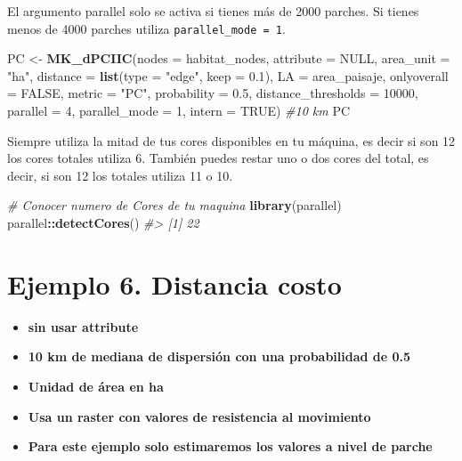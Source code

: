 \documentclass[
]{book}
\newenvironment{Shaded}{\begin{snugshade}}{\end{snugshade}}
\newcommand{\AttributeTok}[1]{\textcolor[rgb]{0.13,0.29,0.53}{#1}}
\newcommand{\CommentTok}[1]{\textcolor[rgb]{0.56,0.35,0.01}{\textit{#1}}}
\newcommand{\ConstantTok}[1]{\textcolor[rgb]{0.56,0.35,0.01}{#1}}
\newcommand{\DecValTok}[1]{\textcolor[rgb]{0.00,0.00,0.81}{#1}}
\newcommand{\FloatTok}[1]{\textcolor[rgb]{0.00,0.00,0.81}{#1}}
\newcommand{\FunctionTok}[1]{\textcolor[rgb]{0.13,0.29,0.53}{\textbf{#1}}}
\newcommand{\NormalTok}[1]{#1}
\newcommand{\OtherTok}[1]{\textcolor[rgb]{0.56,0.35,0.01}{#1}}
\newcommand{\SpecialCharTok}[1]{\textcolor[rgb]{0.81,0.36,0.00}{\textbf{#1}}}
\newcommand{\StringTok}[1]{\textcolor[rgb]{0.31,0.60,0.02}{#1}}
\providecommand{\tightlist}{%
  \setlength{\itemsep}{0pt}\setlength{\parskip}{0pt}}
\begin{document}
El argumento parallel solo se activa si tienes más de 2000 parches. Si tienes menos de 4000 parches utiliza \texttt{parallel\_mode\ =\ 1}.

\begin{Shaded}
\begin{Highlighting}[]
\NormalTok{PC }\OtherTok{\textless{}{-}} \FunctionTok{MK\_dPCIIC}\NormalTok{(}\AttributeTok{nodes =}\NormalTok{ habitat\_nodes,}
                \AttributeTok{attribute =} \ConstantTok{NULL}\NormalTok{,}
                \AttributeTok{area\_unit =} \StringTok{"ha"}\NormalTok{,}
                \AttributeTok{distance =} \FunctionTok{list}\NormalTok{(}\AttributeTok{type =} \StringTok{"edge"}\NormalTok{, }\AttributeTok{keep =} \FloatTok{0.1}\NormalTok{),}
                \AttributeTok{LA =}\NormalTok{ area\_paisaje,}
                \AttributeTok{onlyoverall =} \ConstantTok{FALSE}\NormalTok{,}
                \AttributeTok{metric =} \StringTok{"PC"}\NormalTok{,}
                \AttributeTok{probability =} \FloatTok{0.5}\NormalTok{,}
                \AttributeTok{distance\_thresholds =} \DecValTok{10000}\NormalTok{,}
                \AttributeTok{parallel =} \DecValTok{4}\NormalTok{,}
                \AttributeTok{parallel\_mode =} \DecValTok{1}\NormalTok{,}
                \AttributeTok{intern =} \ConstantTok{TRUE}\NormalTok{) }\CommentTok{\#10 km}
\NormalTok{PC}
\end{Highlighting}
\end{Shaded}

Siempre utiliza la mitad de tus cores disponibles en tu máquina, es decir si son 12 los cores totales utiliza 6. También puedes restar uno o dos cores del total, es decir, si son 12 los totales utiliza 11 o 10.

\begin{Shaded}
\begin{Highlighting}[]
\CommentTok{\# Conocer numero de Cores de tu maquina}
\FunctionTok{library}\NormalTok{(parallel)}
\NormalTok{parallel}\SpecialCharTok{::}\FunctionTok{detectCores}\NormalTok{()}
\CommentTok{\#\textgreater{} [1] 22}
\end{Highlighting}
\end{Shaded}

\section{Ejemplo 6. Distancia costo}\label{ejemplo-6.-distancia-costo}

\begin{itemize}
\tightlist
\item
  \textbf{sin usar attribute}
\item
  \textbf{10 km de mediana de dispersión con una probabilidad de 0.5}
\item
  \textbf{Unidad de área en ha}
\item
  \textbf{Usa un raster con valores de resistencia al movimiento}
\item
  \textbf{Para este ejemplo solo estimaremos los valores a nivel de parche}
\end{itemize}
\end{document}
